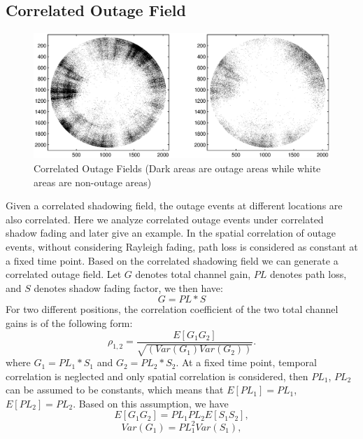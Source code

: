 \subsection{Correlated Outage Field}
\label{2:outagefield}
\begin{figure}
\centering
\includegraphics[width=12cm]{outagefield.eps}
\caption{Correlated Outage Fields (Dark areas are outage areas while white areas are non-outage areas)}
\label{2:outagefie}
\end{figure}
Given a correlated shadowing field, the outage events at different locations are also correlated. Here we analyze correlated outage events under correlated shadow fading and later give an example. In the spatial correlation of outage events, without considering Rayleigh fading, path loss is considered as constant at a fixed time point. Based on the correlated shadowing field we can generate a correlated outage field. Let $G$ denotes total channel gain, $PL$ denotes path loss, %
and $S$ denotes shadow fading factor, we then have:
\begin{equation}
G = PL* S
\end{equation}
For two different positions, the correlation coefficient of the two total channel gains is of the following form:
\begin{equation}
\rho_{1,2} = \frac{E[G_{1}G_{2}]}{\sqrt{(Var(G_{1})Var(G_{2}))}}.
\label{eq1}
\end{equation}
where $G_{1}=PL_{1}*S_{1}$ and $G_{2}=PL_{2}*S_{2}$.
At a fixed time point, temporal correlation is neglected and only spatial correlation is considered, then $PL_{1}$, $PL_{2}$ can be assumed to be constants, which means that $E[PL_{1}] = PL_{1}$, $E[PL_{2}] = PL_{2}$. Based on this assumption, we have
\begin{equation}
E[G_{1}G_{2}] = PL_{1}PL_{2}E[S_{1}S_{2}],
\label{eq2}
\end{equation}
\begin{equation}
Var(G_{1}) = PL_{1}^{2}Var(S_{1}),
\label{eq3}
\end{equation}
